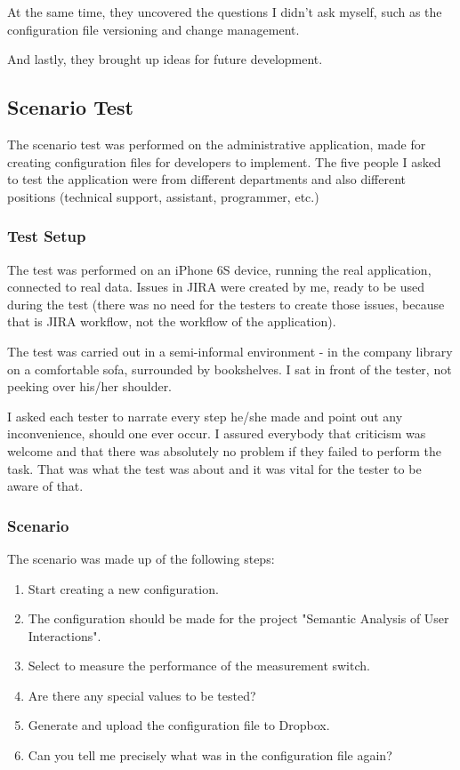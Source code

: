 At the same time, they uncovered the questions I didn't ask myself, such as the configuration file versioning and change management.

And lastly, they brought up ideas for future development.

\subsection{Scenario Test}

The scenario test was performed on the administrative application, made for creating configuration files for developers to implement. The five people \cite{Nielsen:1993:MMF:169059.169166} I asked to test the application were from different departments and also different positions (technical support, assistant, programmer, etc.)

\subsubsection{Test Setup}

The test was performed on an iPhone 6S device, running the real application, connected to real data. Issues in JIRA were created by me, ready to be used during the test (there was no need for the testers to create those issues, because that is JIRA workflow, not the workflow of the application).

The test was carried out in a semi-informal environment - in the company library on a comfortable sofa, surrounded by bookshelves. I sat in front of the tester, not peeking over his/her shoulder. 

I asked each tester to narrate every step he/she made and point out any inconvenience, should one ever occur. I assured everybody that criticism was welcome and that there was absolutely no problem if they failed to perform the task. That was what the test was about and it was vital for the tester to be aware of that.

\newpage

\subsubsection{Scenario}

The scenario was made up of the following steps:

\begin{enumerate}
	\item Start creating a new configuration.
	\item The configuration should be made for the project "Semantic Analysis of User Interactions".
	\item Select to measure the performance of the measurement switch.
	\item Are there any special values to be tested?
	\item Generate and upload the configuration file to Dropbox.
	\item Can you tell me precisely what was in the configuration file again?
\end{enumerate}

